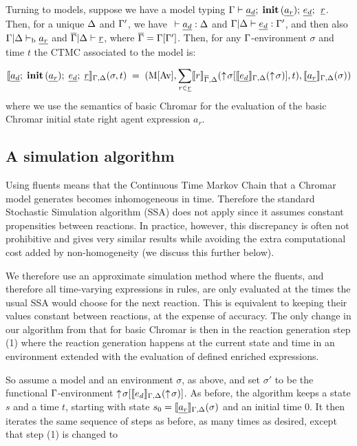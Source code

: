 Turning to models, suppose we have a model typing
$\Gamma \vdash \underline{a_d}; \; \mathbf{init}\, (\underline{a_r}); \, \underline{e_d};\, \; \underline{r}$.
Then, for a unique $\Delta$ and $\Gamma'$, we have $\ \vdash \s{a_d}: \D$ and
$\Gamma | \Delta \vdash \underline{e_d}:\Gamma' $, and then also
$\Gamma | \Delta \vdash_{\mathrm{b}} \underline{a_r}$ and $\overline{\Gamma} | \Delta \vdash \underline{r}$, where
$\overline{\Gamma} = \Gamma[\Gamma']$.
%
Then, for any $\Gamma$-environment $\sigma$ and time $t$ the CTMC associated to the model is:
%

\[\llbracket  \underline{a_d}; \; \mathbf{init}\, (\underline{a_r}); \; \underline{e_d}; \; \underline{r} \rrbracket_{\Gamma,\Delta}(\sigma,t) \; =  \; 
                 (\mathrm{M}[\mathrm{Av}], \sum_{r \in \underline{r}} \llbracket r \rrbracket_{\overline{\Gamma},\Delta}(\uparrow\! \sigma[\llbracket \underline{e_d} \rrbracket_{\Gamma,\Delta}(\uparrow\! \sigma)],t), \llbracket \underline{a_r} \rrbracket_{\Gamma,\Delta}(\sigma))\]
%
               where we use the semantics of basic Chromar for the evaluation of
               the basic Chromar initial state right agent expression $a_r$.
               
\subsection{A simulation algorithm}
\label{sec:simT}
Using fluents means that the Continuous Time Markov Chain that a Chromar model
generates becomes inhomogeneous in time. Therefore the standard Stochastic
Simulation algorithm (SSA) does not apply since it assumes constant propensities
between reactions. In practice, however, this discrepancy is often not
prohibitive and gives very similar results while avoiding the extra
computational cost added by non-homogeneity (we discuss this further below).

We therefore use an approximate simulation method where the fluents, and
therefore all time-varying expressions in rules, are only evaluated at the times
the usual SSA would choose for the next reaction. This is equivalent to keeping
their values constant between reactions, at the expense of accuracy. The only
change in our algorithm from that for basic Chromar is then in the reaction
generation step (1) where the reaction generation happens at the current state
and time in an environment extended with the evaluation of defined enriched
expressions.

So assume a model and an environment $\sigma$, as above, and set $\sigma'$ to be the
functional $\Gamma$-environment $\uparrow\! \sigma[\llbracket e_d \rrbracket_{\Gamma,\Delta}(\uparrow\! \sigma)]$. As before, the
algorithm keeps a state $s$ and a time $t$, starting with state
$s_0 = \llbracket \underline{a_r} \rrbracket_{\Gamma,\Delta}(\sigma)$ and an initial time $0$. It then iterates the same
sequence of steps as before, as many times as desired, except that step (1) is
changed to

